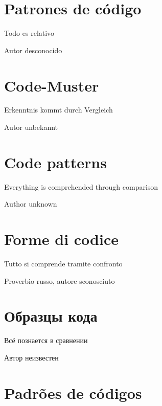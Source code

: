 \ifdefined\SPANISH
\chapter{Patrones de código}

\epigraph{Todo es relativo}{Autor desconocido}
\fi %

\ifdefined\GERMAN
\chapter{Code-Muster}

\epigraph{Erkenntnis kommt durch Vergleich}{Autor unbekannt}
\fi %

\ifdefined\ENGLISH
\chapter{Code patterns}

\epigraph{Everything is comprehended through comparison}{Author unknown}
\fi %

\ifdefined\ITALIAN
\chapter{Forme di codice}

\epigraph{Tutto si comprende tramite confronto}{Proverbio russo, autore sconosciuto}
\fi %

\ifdefined\RUSSIAN
\chapter{Образцы кода}
\epigraph{Всё познается в сравнении}{Автор неизвестен}
\fi %

\ifdefined\BRAZILIAN
\chapter{Padrões de códigos}
\fi %

